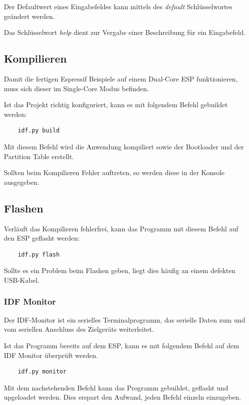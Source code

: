 Der Defaultwert eines Eingabefeldes kann mittels des \textit{default} Schlüsselwortes geändert werden. 

Das Schlüsselwort \textit{help} dient zur Vergabe einer Beschreibung für ein Eingabefeld.

\subsection{Kompilieren}
Damit die fertigen Espressif Beispiele auf einem Dual-Core ESP funktionieren, muss sich dieser im Single-Core Modus befinden.

Ist das Projekt richtig konfiguriert, kann es mit folgendem Befehl gebuildet werden:
\begin{verbatim}
    idf.py build
\end{verbatim}

Mit diesem Befehl wird die Anwendung kompiliert sowie der Bootloader und der Partition Table erstellt.

Sollten beim Kompilieren Fehler auftreten, so werden diese in der Konsole ausgegeben.

\subsection{Flashen}
Verläuft das Kompilieren fehlerfrei, kann das Programm mit diesem Befehl auf den ESP geflasht werden:
\begin{verbatim}
    idf.py flash
\end{verbatim}

Sollte es ein Problem beim Flashen geben, liegt dies häufig an einem defekten USB-Kabel.

\subsubsection{IDF Monitor}\label{sec:monitor}
Der IDF-Monitor ist ein serielles Terminalprogramm, das serielle Daten zum und vom seriellen Anschluss des Zielgeräts weiterleitet.

Ist das Programm bereits auf dem ESP, kann es mit folgendem Befehl auf dem IDF Monitor überprüft werden.

\begin{verbatim}
    idf.py monitor
\end{verbatim}

\pagebreak

Mit dem nachstehenden Befehl kann das Programm gebuildet, geflasht und upgeloadet werden. Dies erspart den Aufwand, jeden Befehl einzeln einzugeben.

